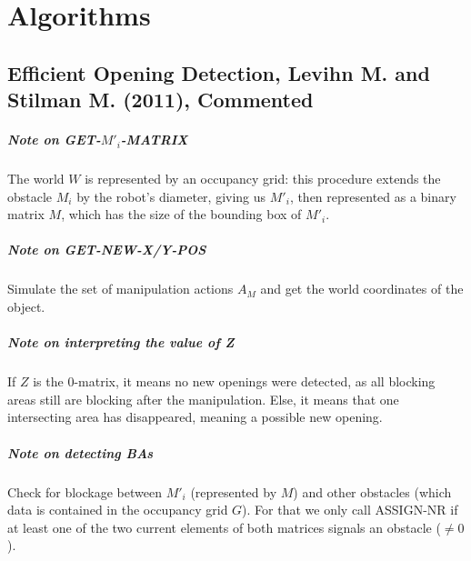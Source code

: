\chapter{Algorithms}

\label{efficient-opening-detection-commented}

\section{Efficient Opening Detection, Levihn M. and Stilman M. (2011), Commented}\label{eod_section}

\paragraph{Note on GET-$M'_{i}$-MATRIX}\label{get_mi_matrix_note} The world $W$ is represented by an occupancy grid: this procedure extends the obstacle $M_{i}$ by the robot's diameter, giving us $M'_{i}$, then represented as a binary matrix $M$, which has the size of the bounding box of $M'_{i}$.


\paragraph{Note on GET-NEW-X/Y-POS}\label{x-y-pos_note} Simulate the set of manipulation actions $A_{M}$ and get the world coordinates of the object.

\paragraph{Note on interpreting the value of Z}\label{interpreting_z_note} If $Z$ is the 0-matrix, it means no new openings were detected, as all blocking areas still are blocking after the manipulation. Else, it means that one intersecting area has disappeared, meaning a possible new opening.

\paragraph{Note on detecting BAs}\label{check_blockage_note} Check for blockage between $M'_{i}$ (represented by $M$) and other obstacles (which data is contained in the occupancy grid $G$). For that we only call ASSIGN-NR if at least one of the two current elements of both matrices signals an obstacle ($\neq 0$).

